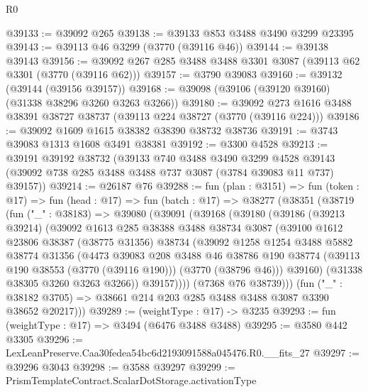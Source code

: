 \begin{lexlean}{R0}
\begin{coremodule}
@39133 := @39092 @265
@39138 := @39133 @853 @3488 @3490 @3299 @23395
@39143 := @39113 @46 @3299 (@3770 (@39116 @46))
@39144 := @39138 @39143
@39156 := @39092 @267 @285 @3488 @3488 @3301 @3087 (@39113 @62 @3301 (@3770 (@39116 @62)))
@39157 := @3790 @39083
@39160 := @39132 (@39144 (@39156 @39157))
@39168 := @39098 (@39106 (@39120 @39160) (@31338 @38296 @3260 @3263 @3266))
@39180 := @39092 @273 @1616 @3488 @38391 @38727 @38737 (@39113 @224 @38727 (@3770 (@39116 @224)))
@39186 := @39092 @1609 @1615 @38382 @38390 @38732 @38736
@39191 := @3743 @39083 @1313 @1608 @3491 @38381
@39192 := @3300 @4528
@39213 := @39191
    @39192
    @38732
    (@39133
      @740
      @3488
      @3490
      @3299
      @4528
      @39143
      (@39092 @738 @285 @3488 @3488 @737 @3087 (@3784 @39083 @11 @737) @39157))
@39214 := @26187 @76
@39288 := fun (plan : @3151) =>
  fun (token : @17) =>
  fun (head : @17) =>
  fun (batch : @17) =>
  @38277
    (@38351
      (@38719
        (fun ("_" : @38183) =>
        @39080
          (@39091
            (@39168
              (@39180
                (@39186
                  (@39213 @39214)
                  (@39092
                    @1613
                    @285
                    @38388
                    @3488
                    @38734
                    @3087
                    (@39100
                      @1612
                      @23806
                      @38387
                      (@38775 @31356)
                      @38734
                      (@39092
                        @1258
                        @1254
                        @3488
                        @5882
                        @38774
                        @31356
                        (@4473
                          @39083
                          @208
                          @3488
                          @46
                          @38786
                          @190
                          @38774
                          (@39113 @190 @38553 (@3770 (@39116 @190)))
                          (@3770 (@38796 @46)))
                        @39160)
                      (@31338 @38305 @3260 @3263 @3266))
                    @39157))))
            (@7368 @76 @38739)))
        (fun ("_" : @38182 @3705) => @38661 @214 @203 @285 @3488 @3488 @3087 @3390 @38652 @20217)))
@39289 := (weightType : @17) -> @3235
@39293 := fun (weightType : @17) => @3494 (@6476 @3488 @3488)
@39295 := @3580 @442 @3305
@39296 := LexLeanPreserve.Caa30fedea54bc6d2193091588a045476.R0.__fits_27
@39297 := @39296 @3043
@39298 := @3588 @39297
@39299 := PrismTemplateContract.ScalarDotStorage.activationType

\end{coremodule}
\end{lexlean}
